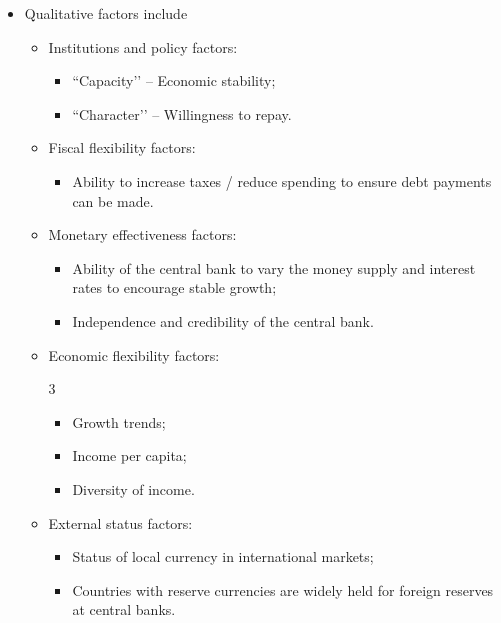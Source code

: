 \documentclass[../notes_compiled.tex]{subfiles}
\begin{document}
\begin{itemize}
\item Qualitative factors include
\begin{itemize}
\item Institutions and policy factors:
\begin{itemize}
\item ``Capacity’’ -- Economic stability;
\item ``Character’’ -- Willingness to repay.
\end{itemize}
\item Fiscal flexibility factors:
\begin{itemize}
\item Ability to increase taxes / reduce spending to ensure debt payments can be made.
\end{itemize}
\item Monetary effectiveness factors:
\begin{itemize}
\item Ability of the central bank to vary the money supply and interest rates to encourage stable growth;
\item Independence and credibility of the central bank.
\end{itemize}
\item Economic flexibility factors:
\begin{multicols}{3}
\begin{itemize}
\item Growth trends;
\item Income per capita;
\item Diversity of income.
\end{itemize}
\end{multicols}
\item External status factors:
\begin{itemize}
\item Status of local currency in international markets;
\item Countries with reserve currencies are widely held for foreign reserves at central banks.
\end{itemize}
\end{itemize}


\end{itemize}
\end{document}
